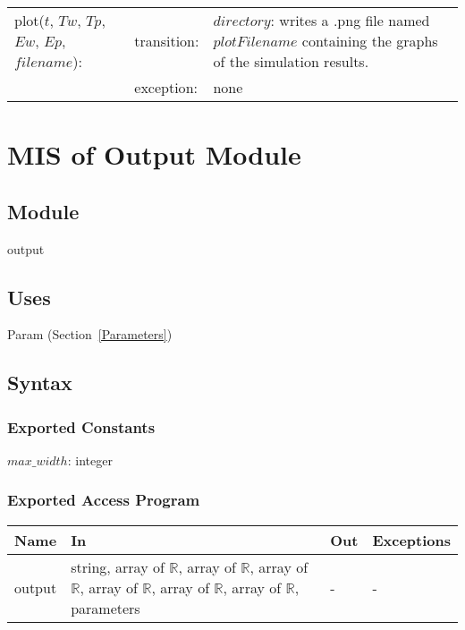 \documentclass[12pt]{article}
\begin{document}
\begin{center}
\begin{tabular}{l l p{6cm}}
plot($t$, $Tw$, $Tp$, $Ew$, $Ep$, $filename$): & transition: & $directory$:
                                                               writes a .png
                                                               file named
                                                               $plotFilename$
                                                               containing the
                                                               graphs of the
                                                               simulation
                                                               results. \\
& exception: & none \\
\end{tabular}
\end{center}

\newpage
\section{MIS of Output Module} \label{Output}

\subsection{Module}

output

\subsection{Uses}

Param (Section~\ref{Parameters})

\subsection{Syntax}

\subsubsection{Exported Constants}

$max\_width$: integer

\subsubsection{Exported Access Program}

\begin{center}
\begin{tabular}{p{3cm} p{7cm} p{2cm} p{2cm}}
\hline
\textbf{Name} & \textbf{In} & \textbf{Out} & \textbf{Exceptions} \\
\hline
output & string, array of $\mathbb{R}$, array of $\mathbb{R}$, array of
         $\mathbb{R}$, array of $\mathbb{R}$, array of $\mathbb{R}$, array of
         $\mathbb{R}$, parameters & - & - \\
\hline
\end{tabular}
\end{center}
\end{document}
